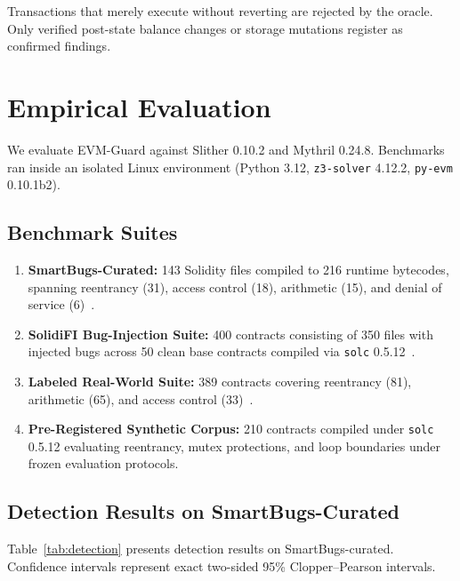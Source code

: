 \documentclass[pdflatex,sn-mathphys]{sn-jnl}
\theoremstyle{thmstyleone}
\theoremstyle{thmstyletwo}
\begin{document}
Transactions that merely execute without reverting are rejected by the oracle. Only verified post-state balance changes or storage mutations register as confirmed findings.

\section{Empirical Evaluation}\label{sec:results}

We evaluate EVM-Guard against Slither 0.10.2 and Mythril 0.24.8. Benchmarks ran inside an isolated Linux environment (Python 3.12, \texttt{z3-solver} 4.12.2, \texttt{py-evm} 0.10.1b2).

\subsection{Benchmark Suites}\label{sec:results:corpus}

\begin{enumerate}
    \item \textbf{SmartBugs-Curated:} 143 Solidity files compiled to 216 runtime bytecodes, spanning reentrancy (31), access control (18), arithmetic (15), and denial of service (6)~\cite{durieux2020empirical}.
    \item \textbf{SolidiFI Bug-Injection Suite:} 400 contracts consisting of 350 files with injected bugs across 50 clean base contracts compiled via \texttt{solc} 0.5.12~\cite{ghaleb2020how}.
    \item \textbf{Labeled Real-World Suite:} 389 contracts covering reentrancy (81), arithmetic (65), and access control (33)~\cite{bitsmartcontract2023benchmark}.
    \item \textbf{Pre-Registered Synthetic Corpus:} 210 contracts compiled under \texttt{solc} 0.5.12 evaluating reentrancy, mutex protections, and loop boundaries under frozen evaluation protocols.
\end{enumerate}

\subsection{Detection Results on SmartBugs-Curated}\label{sec:results:detection}



Table~\ref{tab:detection} presents detection results on SmartBugs-curated. Confidence intervals represent exact two-sided 95\% Clopper--Pearson intervals.
\end{document}
